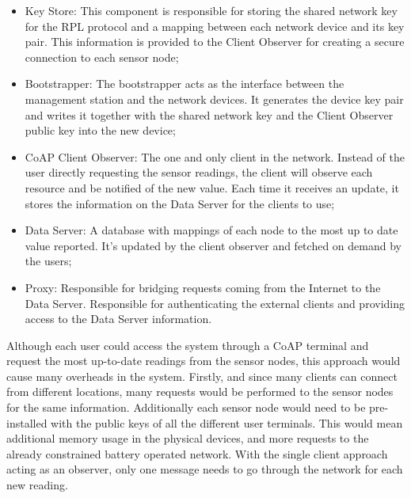 \begin{itemize}
	\item Key Store: This component is responsible for storing the shared network key for the RPL protocol and a mapping between each network device and its key pair. This information is provided to the Client Observer for creating a secure connection to each sensor node;\\
	\item Bootstrapper: The bootstrapper acts as the interface between the management station and the network devices. It generates the device key pair and writes it together with the shared network key and the Client Observer public key into the new device;\\
	\item CoAP Client Observer:  The one and only client in the network. Instead of the user directly requesting the sensor readings, the client will observe each resource and be notified of the new value. Each time it receives an update, it stores the information on the Data Server for the clients to use;\\
	\item Data Server: A database with mappings of each node to the most up to date value reported. It's updated by the client observer and fetched on demand by the users;\\
	\item Proxy: Responsible for bridging requests coming from the Internet to the Data Server. Responsible for authenticating the external clients and providing access to the Data Server information.\\
\end{itemize}

Although each user could access the system through a \gls{CoAP} terminal and request the most up-to-date readings from the sensor nodes, this approach would cause many overheads in the system. Firstly, and since many clients can connect from different locations, many requests would be performed to the sensor nodes for the same information. Additionally each sensor node would need to be pre-installed with the public keys of all the different user terminals. This would mean additional memory usage in the physical devices, and more requests to the already constrained battery operated network. With the single client approach acting as an observer, only one message needs to go through the network for each new reading.

